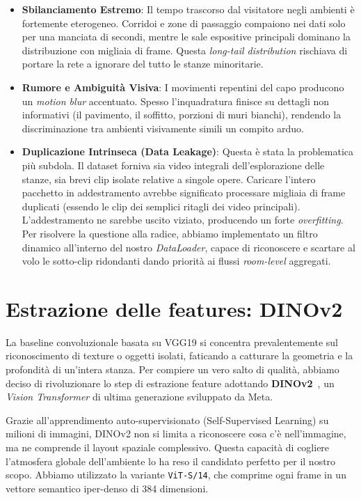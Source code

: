 \documentclass[a4paper,12pt]{report}
\begin{document}
\begin{itemize}
    \item \textbf{Sbilanciamento Estremo}: Il tempo trascorso dal visitatore negli ambienti è fortemente eterogeneo. Corridoi e zone di passaggio compaiono nei dati solo per una manciata di secondi, mentre le sale espositive principali dominano la distribuzione con migliaia di frame. Questa \emph{long-tail distribution} rischiava di portare la rete a ignorare del tutto le stanze minoritarie.
    \item \textbf{Rumore e Ambiguità Visiva}: I movimenti repentini del capo producono un \emph{motion blur} accentuato. Spesso l'inquadratura finisce su dettagli non informativi (il pavimento, il soffitto, porzioni di muri bianchi), rendendo la discriminazione tra ambienti visivamente simili un compito arduo.
    \item \textbf{Duplicazione Intrinseca (Data Leakage)}: Questa è stata la problematica più subdola. Il dataset forniva sia video integrali dell'esplorazione delle stanze, sia brevi clip isolate relative a singole opere. Caricare l'intero pacchetto in addestramento avrebbe significato processare migliaia di frame duplicati (essendo le clip dei semplici ritagli dei video principali). L'addestramento ne sarebbe uscito viziato, producendo un forte \emph{overfitting}. Per risolvere la questione alla radice, abbiamo implementato un filtro dinamico all'interno del nostro \emph{DataLoader}, capace di riconoscere e scartare al volo le sotto-clip ridondanti dando priorità ai flussi \emph{room-level} aggregati.
\end{itemize}

\section{Estrazione delle features: DINOv2}
La baseline convoluzionale basata su VGG19 si concentra prevalentemente sul riconoscimento di texture o oggetti isolati, faticando a catturare la geometria e la profondità di un'intera stanza. Per compiere un vero salto di qualità, abbiamo deciso di rivoluzionare lo step di estrazione feature adottando \textbf{DINOv2}~\cite{dinov2}, un \emph{Vision Transformer} di ultima generazione sviluppato da Meta.

Grazie all'apprendimento auto-supervisionato (Self-Supervised Learning) su milioni di immagini, DINOv2 non si limita a riconoscere cosa c'è nell'immagine, ma ne comprende il layout spaziale complessivo. Questa capacità di cogliere l'atmosfera globale dell'ambiente lo ha reso il candidato perfetto per il nostro scopo. Abbiamo utilizzato la variante \texttt{ViT-S/14}, che comprime ogni frame in un vettore semantico iper-denso di 384 dimensioni.
\end{document}
